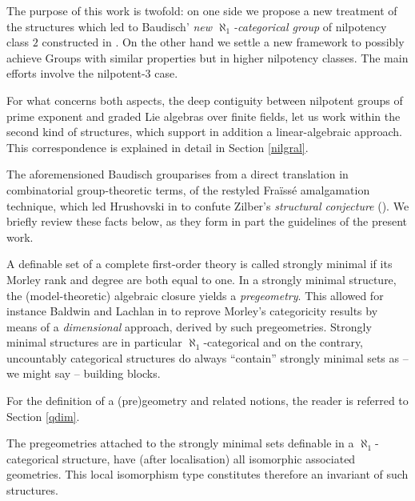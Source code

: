 The purpose of this work is twofold: on one side we propose a new treatment of the structures which led to Baudisch' {\em new
$\aleph_{1}$-categorical group} of nilpotency class $2$ constructed in \cite{bad}. On the other hand we settle
a new framework to possibly achieve Groups with similar properties but in higher nilpotency classes. The main efforts
involve the nilpotent-$3$ case.

For what concerns both aspects, the deep contiguity between nilpotent groups of prime exponent and
graded Lie algebras over finite fields, let us work within the second kind of structures, which support in addition
a linear-algebraic approach. %
This correspondence is explained in detail in Section \ref{nilgral}.

\smallskip
The aforemensioned \lqq Baudisch group\rqq arises from a direct translation in combinatorial group-theoretic terms, of the restyled
Fra\"iss\'e amalgamation technique, which led Hrushovski in \cite{hruabi} to confute Zilber's {\em structural conjecture}
(\cite{zil}). %
We briefly review these facts below, as they form in part the guidelines of the
present work.

\medskip
A definable set of a complete first-order theory is called strongly minimal if its Morley rank and degree are both equal to one.
In a strongly minimal structure, the (model-theoretic) algebraic closure yields a {\em pregeometry}. This allowed for instance
Baldwin and Lachlan in \cite{blsms} to reprove Morley's categoricity results by means of a {\em dimensional} approach, derived
by such pregeometries.
Strongly minimal structures are in particular $\aleph_{1}$-categorical
and on the contrary, uncountably categorical structures do always ``contain'' strongly minimal sets as
-- we might say -- building blocks.

For the definition of a (pre)geometry and related notions, the reader is referred to Section \ref{qdim}.

The pregeometries attached to the strongly minimal sets definable in a
$\aleph_{1}$-categorical structure, have (after localisation) all isomorphic associated geometries. This local isomorphism type
constitutes therefore an invariant of such structures.

